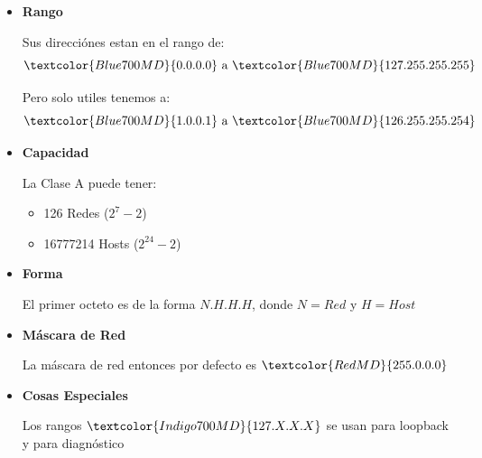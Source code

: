 \documentclass[12pt, fleqn]{report}                             %
\theoremstyle{break}                                            %
\newcommand{\Color}[2]{\textcolor{#1}{#2}}                      %
\begin{document}
                \begin{itemize}
                    \item 
                        \textbf{Rango}

                        Sus direcciónes estan en el rango de:
                        \begin{equation*}
                            \Color{Blue700MD}{0.0.0.0}
                            \text{ a }
                            \Color{Blue700MD}{127.255.255.255}
                        \end{equation*}

                        Pero solo utiles tenemos a:
                        \begin{equation*}
                            \Color{Blue700MD}{1.0.0.1}
                            \text{ a }
                            \Color{Blue700MD}{126.255.255.254}
                        \end{equation*}

                    \item
                        \textbf{Capacidad}

                            La Clase A puede tener:
                            \begin{itemize}
                                \item 126 Redes ($2^7 - 2$)
                                \item 16777214 Hosts ($2^{24} - 2$)
                            \end{itemize}

                    \item
                        \textbf{Forma}

                            El primer octeto es de la forma $N.H.H.H$, donde $N = Red$ y $H = Host$

                    \item
                        \textbf{Máscara de Red}

                            La máscara de red entonces por defecto es $\Color{RedMD}{255.0.0.0}$

                    \item
                        \textbf{Cosas Especiales}

                            Los rangos $\Color{Indigo700MD}{127.X.X.X}$ se usan para loopback y para diagnóstico

                \end{itemize}
\end{document}
